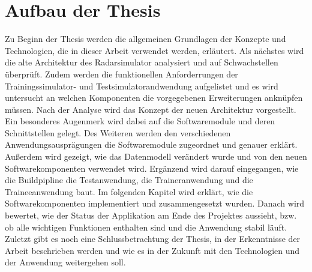 \section{Aufbau der Thesis}
Zu Beginn der Thesis werden die allgemeinen Grundlagen der Konzepte und Technologien, die in dieser Arbeit verwendet werden, erläutert. Als nächstes wird die alte Architektur des Radarsimulator analysiert und auf Schwachstellen überprüft. Zudem werden die funktionellen Anforderrungen der Trainingssimulator- und Testsimulatorandwendung aufgelistet und es wird untersucht an welchen Komponenten die vorgegebenen Erweiterungen anknüpfen müssen. Nach der Analyse wird das Konzept der neuen Architektur vorgestellt. Ein besonderes Augenmerk wird dabei auf die Softwaremodule und deren Schnittstellen gelegt. Des Weiteren werden den verschiedenen Anwendungsausprägungen die Softwaremodule zugeordnet und genauer erklärt. Außerdem wird gezeigt, wie das Datenmodell verändert wurde und von den neuen Softwarekomponenten verwendet wird. Ergänzend wird darauf eingegangen, wie die Buildpipline die Testanwendung, die Traineranwendung und die Traineeanwendung baut. Im folgenden Kapitel wird erklärt, wie die Softwarekomponenten implementiert und zusammengesetzt wurden. Danach wird bewertet, wie der Status der Applikation am Ende des Projektes aussieht, bzw. ob alle wichtigen Funktionen enthalten sind und die Anwendung stabil läuft. Zuletzt gibt es noch eine Schlussbetrachtung der Thesis, in der Erkenntnisse der Arbeit beschrieben werden und wie es in der Zukunft mit den Technologien und der Anwendung weitergehen soll.
